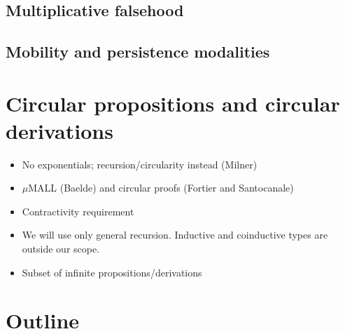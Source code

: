\begin{marginfigure}
  \begin{inferences}
    \\
    \\
    \\
  \end{inferences}
\end{marginfigure}

\subsection{Multiplicative falsehood}

\subsection{Mobility and persistence modalities}



\section{Circular propositions and circular derivations}

\begin{itemize}
\item No exponentials; recursion/circularity instead (Milner)
\item $\mu$MALL (Baelde) and circular proofs (Fortier and Santocanale)
\item Contractivity requirement
\item We will use only general recursion.
  Inductive and coinductive types are outside our scope.
\item Subset of infinite propositions/derivations
\end{itemize}


\section{Outline}

